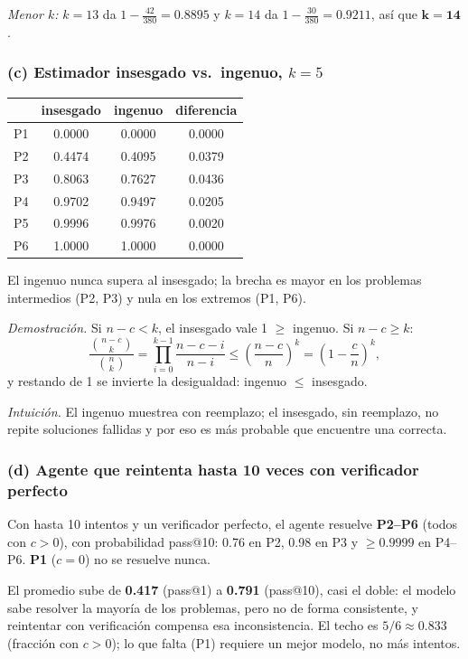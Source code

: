 \documentclass[11pt]{article}
\begin{document}
\emph{Menor $k$:} $k=13$ da $1-\frac{42}{380}=0.8895$ y $k=14$ da $1-\frac{30}{380}=0.9211$, así que $\mathbf{k=14}$.

\subsubsection*{(c) Estimador insesgado vs.\ ingenuo, $k=5$}
\begin{table}[H]
\centering
\begin{tabular}{lccc}
\toprule
 & insesgado & ingenuo & diferencia \\
\midrule
P1 & 0.0000 & 0.0000 & 0.0000 \\
P2 & 0.4474 & 0.4095 & 0.0379 \\
P3 & 0.8063 & 0.7627 & 0.0436 \\
P4 & 0.9702 & 0.9497 & 0.0205 \\
P5 & 0.9996 & 0.9976 & 0.0020 \\
P6 & 1.0000 & 1.0000 & 0.0000 \\
\bottomrule
\end{tabular}
\end{table}

El ingenuo nunca supera al insesgado; la brecha es mayor en los problemas intermedios (P2, P3) y nula en los extremos (P1, P6).

\emph{Demostración.} Si $n-c<k$, el insesgado vale 1 $\ge$ ingenuo. Si $n-c\ge k$:
\[\frac{\binom{n-c}{k}}{\binom nk}=\prod_{i=0}^{k-1}\frac{n-c-i}{n-i}\le\left(\frac{n-c}{n}\right)^k=\left(1-\frac cn\right)^k,\]
y restando de 1 se invierte la desigualdad: ingenuo $\le$ insesgado.

\emph{Intuición.} El ingenuo muestrea con reemplazo; el insesgado, sin reemplazo, no repite soluciones fallidas y por eso es más probable que encuentre una correcta.

\subsubsection*{(d) Agente que reintenta hasta 10 veces con verificador perfecto}
Con hasta 10 intentos y un verificador perfecto, el agente resuelve \textbf{P2--P6} (todos con $c>0$), con probabilidad pass@10: 0.76 en P2, 0.98 en P3 y $\ge0.9999$ en P4--P6. \textbf{P1} ($c=0$) no se resuelve nunca.

El promedio sube de \textbf{0.417} (pass@1) a \textbf{0.791} (pass@10), casi el doble: el modelo sabe resolver la mayoría de los problemas, pero no de forma consistente, y reintentar con verificación compensa esa inconsistencia. El techo es $5/6\approx0.833$ (fracción con $c>0$); lo que falta (P1) requiere un mejor modelo, no más intentos.

\newpage

\printbibliography
\end{document}
